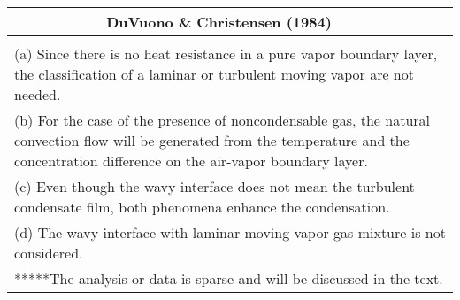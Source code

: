 \documentclass[12pt,fleqn]{report}
\begin{document}
{\begin{sidewaystable}
\begin{minipage}{9.0in}
\begin{center}
{\begin{tabular}{*{8}{l}}
& & & & DuVuono \& Christensen (1984) & & & \\  [2mm] \hline
& & & & & & & \\ 
\multicolumn{8}{l}{(a)  Since there is no heat resistance in a pure vapor boundary layer, the classification of a laminar or turbulent moving vapor are not needed.}\\ 
\multicolumn{8}{l}{(b)  For the case of the presence of noncondensable gas, the natural convection flow will be generated from the temperature and the concentration difference on the air-vapor boundary layer.}\\ 
\multicolumn{8}{l}{(c)  Even though the wavy interface does not mean the turbulent condensate film, both phenomena enhance the condensation.}\\ 
\multicolumn{8}{l}{(d)  The wavy interface with laminar moving vapor-gas mixture is not considered.}\\ [4mm]
\multicolumn{8}{l}{*****The analysis or data is sparse and will be discussed in the text.}
\end{tabular}
}
\end{center}
\end{minipage}
\end{sidewaystable}
}
\end{document}
